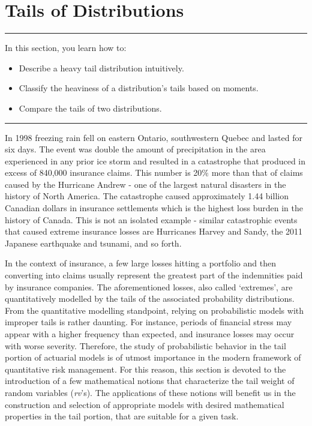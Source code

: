 \documentclass[]{book}
\providecommand{\tightlist}{%
  \setlength{\itemsep}{0pt}\setlength{\parskip}{0pt}}
\theoremstyle{definition}
\theoremstyle{definition}
\theoremstyle{definition}
\theoremstyle{remark}
\begin{document}
\section{Tails of Distributions}\label{S:Tails}

\begin{center}\rule{0.5\linewidth}{\linethickness}\end{center}

In this section, you learn how to:

\begin{itemize}
\tightlist
\item
  Describe a heavy tail distribution intuitively.
\item
  Classify the heaviness of a distribution's tails based on moments.
\item
  Compare the tails of two distributions.
\end{itemize}

\begin{center}\rule{0.5\linewidth}{\linethickness}\end{center}

In 1998 freezing rain fell on eastern Ontario, southwestern Quebec and
lasted for six days. The event was double the amount of precipitation in
the area experienced in any prior ice storm and resulted in a
catastrophe that produced in excess of 840,000 insurance claims. This
number is 20\(\%\) more than that of claims caused by the Hurricane
Andrew - one of the largest natural disasters in the history of North
America. The catastrophe caused approximately 1.44 billion Canadian
dollars in insurance settlements which is the highest loss burden in the
history of Canada. This is not an isolated example - similar
catastrophic events that caused extreme insurance losses are Hurricanes
Harvey and Sandy, the 2011 Japanese earthquake and tsunami, and so
forth.

In the context of insurance, a few large losses hitting a portfolio and
then converting into claims usually represent the greatest part of the
indemnities paid by insurance companies. The aforementioned losses, also
called `extremes', are quantitatively modelled by the tails of the
associated probability distributions. From the quantitative modelling
standpoint, relying on probabilistic models with improper tails is
rather daunting. For instance, periods of financial stress may appear
with a higher frequency than expected, and insurance losses may occur
with worse severity. Therefore, the study of probabilistic behavior in
the tail portion of actuarial models is of utmost importance in the
modern framework of quantitative risk management. For this reason, this
section is devoted to the introduction of a few mathematical notions
that characterize the tail weight of random variables (\emph{rv}'s). The
applications of these notions will benefit us in the construction and
selection of appropriate models with desired mathematical properties in
the tail portion, that are suitable for a given task.
\end{document}
